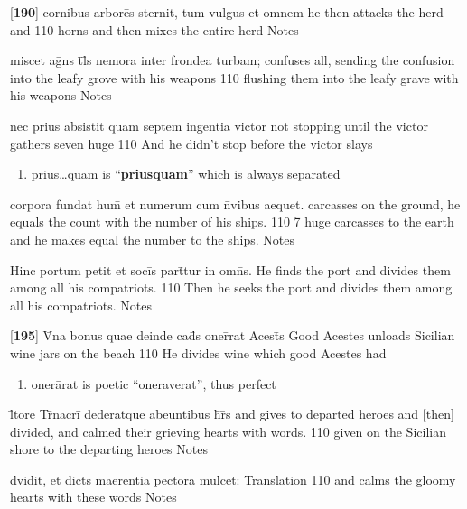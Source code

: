 \latline
  {[\textbf{190}] cornibus arbore\={\macron {\i}}s sternit, tum vulgus et omnem}
  { he then attacks the herd and  }
  {110}
  { horns and then mixes the entire herd }
  { Notes }


\latline
  {miscet ag\={}ns t\={}l\={\macron {\i}}s nemora inter frondea turbam;}
  { confuses all, sending the confusion into the leafy grove with his weapons }
  {110}
  { flushing them into the leafy grave with his weapons }
  { Notes }


\latline
  {nec prius absistit quam septem ingentia victor }
  { not stopping until the victor gathers seven huge }
  {110}
  { And he didn't stop before the victor slays }
  { \begin{enumerate}
  	\item prius{\ldots}quam is ``\textbf{priusquam}'' which is always separated
  \end{enumerate} }



\latline
  {corpora fundat hum\={\macron {\i}} et numerum cum n\={}vibus aequet.}
  { carcasses on the ground, he equals the count with the number of his ships. }
  {110}
  { 7 huge carcasses to the earth and he makes equal the number to the ships. }
  { Notes }


\latline
  {Hinc portum petit et soci\={}s part\={\macron {\i}}tur in omn\={\macron {\i}}s.}
  { He finds the port and divides them among all his compatriots. }
  {110}
  { Then he seeks the port and divides them among all his compatriots. }
  { Notes }


\latline
  {[\textbf{195}] V\={\macron {\i}}na bonus quae deinde cad\={\macron {\i}}s oner\={}rat Acest\={}s}
  { Good Acestes unloads Sicilian wine jars on the beach }
  {110}
  { He divides wine which good Acestes had  }
  { \begin{enumerate}
  	\item oner\={a}rat is poetic ``oneraverat'', thus perfect
  \end{enumerate} }



\latline
  {l\={\macron {\i}}tore Tr\={\macron {\i}}nacri\={} dederatque abeuntibus h\={}r\={}s}
  { and gives to departed heroes and [then] divided, and calmed their grieving hearts with words. }
  {110}
  { given on the Sicilian shore to the departing heroes }
  { Notes }

\latline
  {d\={\macron {\i}}vidit, et dict\={\macron {\i}}s maerentia pectora mulcet:}
  { Translation }
  {110}
  { and calms the gloomy hearts with these words }
  { Notes }

